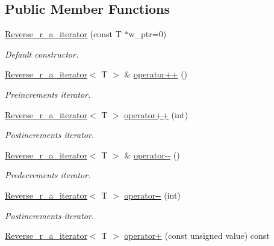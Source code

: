 \subsection*{Public Member Functions}
\begin{DoxyCompactItemize}
\item 
\hyperlink{classtasks_1_1Reverse__r__a__iterator_ac0577f7466a32d84e4dc748ecf361100}{Reverse\+\_\+r\+\_\+a\+\_\+iterator} (const T $\ast$w\+\_\+ptr=0)
\begin{DoxyCompactList}\small\item\em Default constructor. \end{DoxyCompactList}\item 
\hyperlink{classtasks_1_1Reverse__r__a__iterator}{Reverse\+\_\+r\+\_\+a\+\_\+iterator}$<$ T $>$ \& \hyperlink{classtasks_1_1Reverse__r__a__iterator_a74a2f10fa0a78b40661f73ff36e0d2d4}{operator++} ()
\begin{DoxyCompactList}\small\item\em Preincrements iterator. \end{DoxyCompactList}\item 
\hyperlink{classtasks_1_1Reverse__r__a__iterator}{Reverse\+\_\+r\+\_\+a\+\_\+iterator}$<$ T $>$ \hyperlink{classtasks_1_1Reverse__r__a__iterator_a9fc984c2d32e326958658ad1a9f393b8}{operator++} (int)
\begin{DoxyCompactList}\small\item\em Postincrements iterator. \end{DoxyCompactList}\item 
\hyperlink{classtasks_1_1Reverse__r__a__iterator}{Reverse\+\_\+r\+\_\+a\+\_\+iterator}$<$ T $>$ \& \hyperlink{classtasks_1_1Reverse__r__a__iterator_adbed05e18e379b3229d5cba87f9a7753}{operator-\/-\/} ()
\begin{DoxyCompactList}\small\item\em Predecrements iterator. \end{DoxyCompactList}\item 
\hyperlink{classtasks_1_1Reverse__r__a__iterator}{Reverse\+\_\+r\+\_\+a\+\_\+iterator}$<$ T $>$ \hyperlink{classtasks_1_1Reverse__r__a__iterator_a6c72a44a932c9ee596f3d142e8f8cd71}{operator-\/-\/} (int)
\begin{DoxyCompactList}\small\item\em Postincrements iterator. \end{DoxyCompactList}\item 
\hyperlink{classtasks_1_1Reverse__r__a__iterator}{Reverse\+\_\+r\+\_\+a\+\_\+iterator}$<$ T $>$ \hyperlink{classtasks_1_1Reverse__r__a__iterator_afe21d5fcac2cf9318d5c5acdb2f40699}{operator+} (const unsigned value) const 

\end{DoxyCompactItemize}
